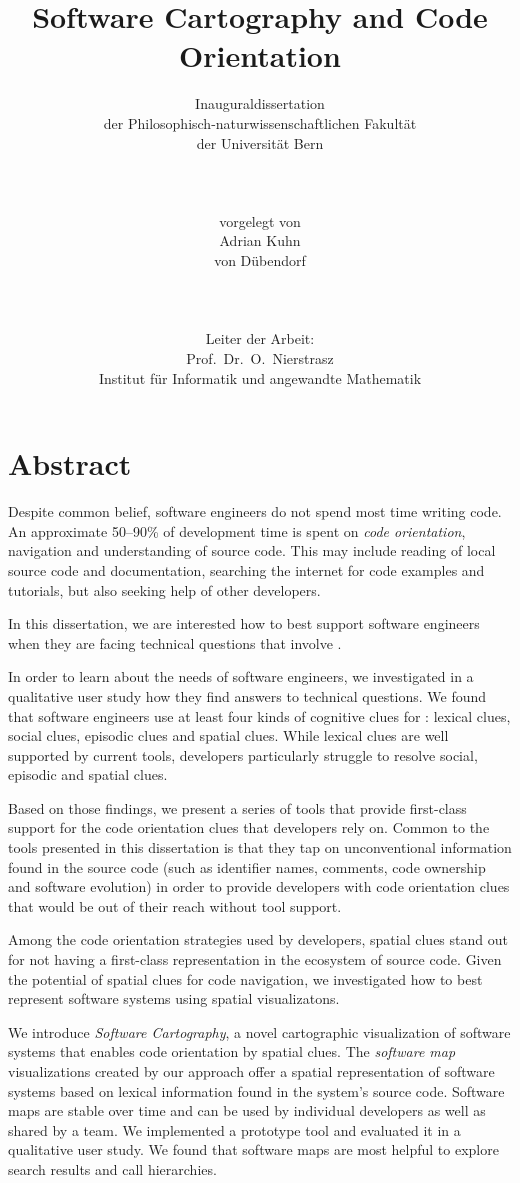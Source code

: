 \documentclass[10pt]{book}
\title{Software Cartography and Code Orientation}
\author{Inauguraldissertation\\
der Philosophisch-naturwissenschaftlichen Fakult\"at\\
der Universit\"at Bern\\
\\
\\
\\
vorgelegt von\\
Adrian Kuhn\\
von D\"ubendorf\\ 
\\
\\
\\
Leiter der Arbeit:\\
Prof.\ Dr.\ O.\ Nierstrasz\\ 
Institut f\"ur Informatik und angewandte Mathematik}
\date{}
\begin{document}
\maketitle

\chapter*{Abstract}

Despite common belief, software engineers do not spend most time writing code. An approximate 50--90\% of development time is spent on \emph{code orientation}, \ie navigation and understanding of source code. This may include reading of local source code and documentation, searching the internet for code examples and tutorials, but also seeking help of other developers. 

In this dissertation, we are interested how to best support software engineers when they are facing technical questions that involve \codenavigation. 

In order to learn about the \codenavigation needs of software engineers, we investigated in a qualitative user study how they find answers to technical questions. We found that software engineers use at least four kinds of cognitive clues for \codenavigation: 
	lexical clues, 
	social clues, 
	episodic clues 
	and spatial clues.
While lexical clues are well supported by current tools, developers particularly struggle to resolve social, episodic and spatial clues. 

Based on those findings, we present a series of tools that provide first-class support for the code orientation clues that developers rely on. Common to the tools presented in this dissertation is that they tap on unconventional information found in the source code (such as identifier names, comments, code ownership and software evolution) in order to provide developers with code orientation clues that would be out of their reach without tool support.

Among the code orientation strategies used by developers, spatial clues stand out for not having a first-class representation in the ecosystem of source code. Given the potential of spatial clues for code navigation, we investigated how to best represent software systems using spatial visualizatons. 

We introduce \emph{Software Cartography}, a novel cartographic visualization of software systems that enables code orientation by spatial clues. The \emph{software map} visualizations created by our approach offer a spatial representation of software systems based on lexical information found in the system's source code. 
Software maps are stable over time and can be used by individual developers as well as shared by a team. 
We implemented a prototype tool and evaluated it in a qualitative user study. We found that software maps are most helpful to explore search results and call hierarchies.
\end{document}
